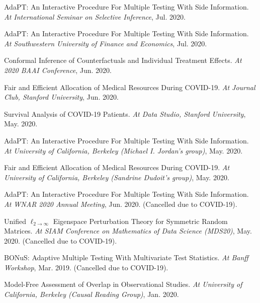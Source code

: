 \documentclass{article}
\begin{document}
\vspace{2mm}
AdaPT: An Interactive Procedure For Multiple Testing With Side Information. \emph{At International Seminar on Selective Inference}, Jul. 2020. 

\vspace{2mm}
AdaPT: An Interactive Procedure For Multiple Testing With Side Information. \emph{At Southwestern University of Finance and Economics}, Jul. 2020. 

\vspace{2mm}
Conformal Inference of Counterfactuals and Individual Treatment Effects. \emph{At 2020 BAAI Conference}, Jun. 2020. 

\vspace{2mm}
Fair and Efficient Allocation of Medical Resources During COVID-19. \emph{At Journal Club, Stanford University}, Jun. 2020.

\vspace{2mm}
Survival Analysis of COVID-19 Patients. \emph{At Data Studio, Stanford University}, May. 2020.

\vspace{2mm}
AdaPT: An Interactive Procedure For Multiple Testing With Side Information. \emph{At University of California, Berkeley (Michael I. Jordan's group)}, May. 2020. 

\vspace{2mm}
Fair and Efficient Allocation of Medical Resources During COVID-19. \emph{At University of California, Berkeley (Sandrine Dudoit's group)}, May. 2020. 

\vspace{2mm}
AdaPT: An Interactive Procedure For Multiple Testing With Side Information. \emph{At WNAR 2020 Annual Meeting}, Jun. 2020. (Cancelled due to COVID-19).

\vspace{2mm}
Unified $\ell_{2\rightarrow\infty}$ Eigenspace Perturbation Theory for Symmetric Random Matrices. \emph{At SIAM Conference on Mathematics of Data Science (MDS20)}, May. 2020. (Cancelled due to COVID-19).

\vspace{2mm}
BONuS: Adaptive Multiple Testing With Multivariate Test Statistics. \emph{At Banff Workshop}, Mar. 2019. (Cancelled due to COVID-19).

\vspace{2mm}
Model-Free Assessment of Overlap in Observational Studies. \emph{At University of California, Berkeley (Causal Reading Group)}, Jan. 2020.
\end{document}
